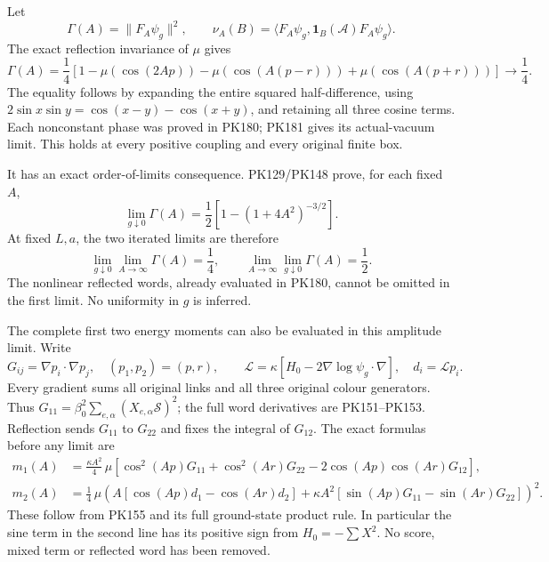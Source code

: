 \documentclass[11pt]{article}
\begin{document}
Let
\[
 \Gamma(A)=\|F_A\psi_g\|^2,\qquad
 \nu_A(B)=\langle F_A\psi_g,\mathbf1_B(\mathcal A)F_A\psi_g\rangle .
\]
The exact reflection invariance of \(\mu\) gives
\[
 \Gamma(A)=\frac14\left[
 1-\mu(\cos(2Ap))-\mu(\cos(A(p-r)))
                         +\mu(\cos(A(p+r)))\right]
 \longrightarrow\frac14 .
 \tag{PK182}
\]
The equality follows by expanding the entire squared half-difference,
using \(2\sin x\sin y=\cos(x-y)-\cos(x+y)\), and retaining all
three cosine terms. Each nonconstant phase was proved in PK180;
PK181 gives its actual-vacuum limit. This holds at every positive
coupling and every original finite box.

It has an exact order-of-limits consequence. PK129/PK148 prove, for
each fixed \(A\),
\[
 \lim_{g\downarrow0}\Gamma(A)
       =\frac12\left[1-(1+4A^2)^{-3/2}\right].
\]
At fixed \(L,a\), the two iterated limits are therefore
\[
 \lim_{g\downarrow0}\lim_{A\to\infty}\Gamma(A)=\frac14,
 \qquad
 \lim_{A\to\infty}\lim_{g\downarrow0}\Gamma(A)=\frac12 .
 \tag{PK183}
\]
The nonlinear reflected words, already evaluated in PK180, cannot
be omitted in the first limit. No uniformity in \(g\) is inferred.

The complete first two energy moments can also be evaluated in
this amplitude limit. Write
\[
 G_{ij}=\nabla p_i\cdot\nabla p_j,\quad
 (p_1,p_2)=(p,r),\qquad
 \mathscr L=\kappa[H_0-2\nabla\log\psi_g\cdot\nabla],
 \quad d_i=\mathscr Lp_i .
 \tag{PK184}
\]
Every gradient sums all original links and all three original colour
generators. Thus \(G_{11}=\beta_0^2\sum_{e,\alpha}
(X_{e,\alpha}\mathcal S)^2\); the full word derivatives are
PK151–PK153. Reflection sends \(G_{11}\) to \(G_{22}\) and fixes
the integral of \(G_{12}\). The exact formulas before any limit are
\[
 \begin{split}
 m_1(A)
 &=\frac{\kappa A^2}{4}\,
 \mu\!\left[
       \cos^2(Ap)G_{11}+\cos^2(Ar)G_{22}
                  -2\cos(Ap)\cos(Ar)G_{12}\right],\\
 m_2(A)
 &=\frac14\,\mu\!\left(
 A[\cos(Ap)d_1-\cos(Ar)d_2]
 +\kappa A^2[\sin(Ap)G_{11}-\sin(Ar)G_{22}]
                         \right)^2 .
 \end{split}\tag{PK185}
\]
These follow from PK155 and its full ground-state product rule.
In particular the sine term in the second line has its positive
sign from \(H_0=-\sum X^2\). No score, mixed term or reflected
word has been removed.
\end{document}
